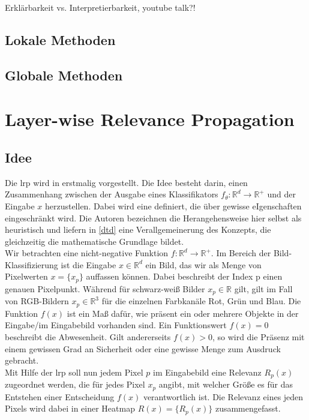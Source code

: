 \documentclass[twoside, 11pt,a4paper]{article}
\numberwithin{equation}{section}
\begin{document}
	Erklärbarkeit vs. Interpretierbarkeit, youtube talk?!
	
	\subsection{Lokale Methoden}
	
	\subsection{Globale Methoden}
	
	\section{Layer-wise Relevance Propagation} \label{chapter_lrp}
	\subsection{Idee}
	
	Die \gls{lrp} wird in \cite{LRP_first_paper} erstmalig vorgestellt. Die Idee besteht darin, einen Zusammenhang zwischen der Ausgabe eines Klassifikators $f_{\theta}: \mathbb{R}^d\to \mathbb{R^{+}}$ und der Eingabe $x$ herzustellen. Dabei wird eine definiert, die über gewisse eIgenschaften eingeschränkt wird. Die Autoren bezeichnen die Herangehensweise hier selbst als heuristisch und liefern in \ref{dtd} eine Verallgemeinerung des Konzepts, die gleichzeitig die mathematische Grundlage bildet.\\
	
	Wir betrachten eine nicht-negative Funktion $f: \mathbb{R}^d \to \mathbb{R}^{+}$. Im Bereich der Bild-Klassifizierung ist die Eingabe $x \in \mathbb{R}^d$ ein Bild, das wir als Menge von Pixelwerten $x=\lbrace x_p \rbrace$ auffassen können. Dabei beschreibt der Index p einen genauen Pixelpunkt. Während für schwarz-weiß Bilder $x_p \in \mathbb{R}$ gilt, gilt im Fall von RGB-Bildern $x_p \in \mathbb{R}^3$ für die einzelnen Farbkanäle Rot, Grün und Blau. Die Funktion $f(x)$ ist ein Maß dafür, wie präsent ein oder mehrere Objekte in der Eingabe/im Eingabebild vorhanden sind. Ein Funktionswert $f(x)=0$ beschreibt die Abwesenheit. Gilt andererseits $f(x) >0$, so wird die Präsenz mit einem gewissen Grad an Sicherheit oder eine gewisse Menge zum Ausdruck gebracht.\\
	
	Mit Hilfe der \gls{lrp} soll nun jedem Pixel $p$ im Eingabebild eine Relevanz $R_p(x)$ zugeordnet werden, die für jedes Pixel $x_p$ angibt, mit welcher Größe es für das Entstehen einer Entscheidung $f(x)$ verantwortlich ist. Die Relevanz eines jeden Pixels wird dabei in einer Heatmap $R(x) = \lbrace R_p(x) \rbrace$ zusammengefasst.
	
\end{document}
